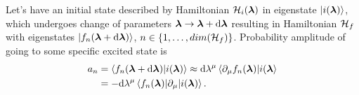 Let's have an initial state described by Hamiltonian $\mathcal{H}_i({\bm\lambda})$ in eigenstate $\ket{i({\bm\lambda})}$, which undergoes change of parameters ${\bm\lambda}\rightarrow {\bm\lambda}+\mathrm{d} {\bm\lambda}$ resulting in Hamiltonian $\mathcal{H}_f$ with eigenstates $\ket{f_n({\bm\lambda}+\mathrm{d} {\bm\lambda})}$, $n\in \{1,\dots,dim(\mathcal{H}_f)\}$. Probability amplitude of going to some specific excited state is
\begin{equation}
    \begin{split}
        a_n&=\braket{f_n({\bm\lambda}+\mathrm{d}{\bm\lambda})|i({\bm\lambda})}\approx \mathrm{d}\lambda^\mu\braket{\partial_\mu f_n({\bm\lambda})|i({\bm\lambda}} \\
        &= -\mathrm{d}\lambda^\mu\braket{f_n({\bm\lambda})|\partial_\mu|i({\bm\lambda})}.
    \end{split}
\end{equation}

